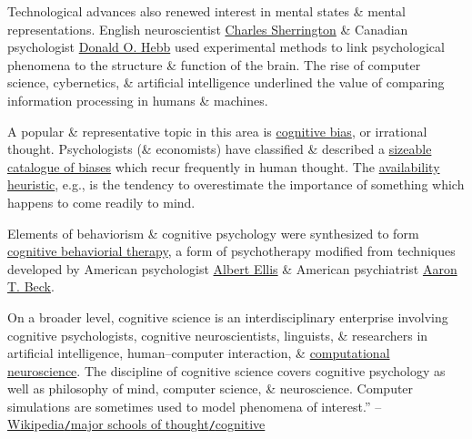 \documentclass[oneside]{book}
\numberwithin{equation}{section}
\begin{document}
Technological advances also renewed interest in mental states \& mental representations. English neuroscientist \href{https://en.wikipedia.org/wiki/Charles_Sherrington}{Charles Sherrington} \& Canadian psychologist \href{https://en.wikipedia.org/wiki/Donald_O._Hebb}{Donald O. Hebb} used experimental methods to link psychological phenomena to the structure \& function of the brain. The rise of computer science, cybernetics, \& artificial intelligence underlined the value of comparing information processing in humans \& machines.

A popular \& representative topic in this area is \href{https://en.wikipedia.org/wiki/Cognitive_bias}{cognitive bias}, or irrational thought. Psychologists (\& economists) have classified \& described a \href{https://en.wikipedia.org/wiki/List_of_cognitive_biases}{sizeable catalogue of biases} which recur frequently in human thought. The \href{https://en.wikipedia.org/wiki/Availability_heuristic}{availability heuristic}, e.g., is the tendency to overestimate the importance of something which happens to come readily to mind.

Elements of behaviorism \& cognitive psychology were synthesized to form \href{https://en.wikipedia.org/wiki/Cognitive_behavioral_therapy}{cognitive behaviorial therapy}, a form of psychotherapy modified from techniques developed by American psychologist \href{https://en.wikipedia.org/wiki/Albert_Ellis_(psychologist)}{Albert Ellis} \& American psychiatrist \href{https://en.wikipedia.org/wiki/Aaron_Beck}{Aaron T. Beck}.

On a broader level, cognitive science is an interdisciplinary enterprise involving cognitive psychologists, cognitive neuroscientists, linguists, \& researchers in artificial intelligence, human--computer interaction, \& \href{https://en.wikipedia.org/wiki/Computational_neuroscience}{computational neuroscience}. The discipline of cognitive science covers cognitive psychology as well as philosophy of mind, computer science, \& neuroscience. Computer simulations are sometimes used to model phenomena of interest.'' -- \href{https://en.wikipedia.org/wiki/Psychology#Cognitive}{Wikipedia\texttt{/}major schools of thought\texttt{/}cognitive}
\end{document}
